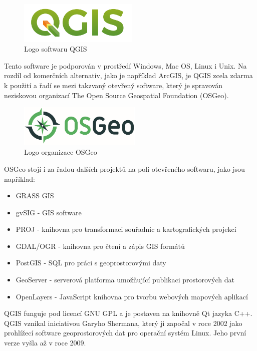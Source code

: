 \documentclass[a4paper,oneside,12pt]{book}
\begin{document}
\begin{figure}[ht] \label{obr2}
\centering
\includegraphics[height=2cm]{pictures/qgis-logo.png}
\caption{Logo softwaru QGIS}
\label{fig:QGIS}
\end{figure}

\hspace{10mm} Tento software je podporován v prostředí Windows, Mac OS, Linux i Unix. Na rozdíl od komerčních alternativ, jako je například ArcGIS, je QGIS zcela zdarma k použití a řadí se mezi takzvaný otevřený software, který je spravován neziskovou organizací The Open Source Geospatial Foundation (OSGeo).

\begin{figure}[ht] \label{obr3}
\centering
\includegraphics[height=2cm]{pictures/Osgeo.png}
\caption{ Logo organizace OSGeo}
\label{fig:OSGEO}
\end{figure}

\hspace{10mm} OSGeo stojí i za řadou dalších projektů na poli otevřeného softwaru, jako jsou například:
\begin{itemize}
\item GRASS GIS 
\item gvSIG - GIS software
\item PROJ - knihovna pro transformaci souřadnic a kartografických projekcí
\item GDAL/OGR - knihovna pro čtení a zápis GIS formátů
\item PostGIS - SQL pro práci s geoprostorovými daty
\item GeoServer - serverová platforma umožňující publikaci prostorových dat 
\item OpenLayers - JavaScript knihovna pro tvorbu webových mapových aplikací
\end{itemize}


\hspace{10mm} QGIS funguje pod licencí GNU GPL a je postaven na knihovně Qt jazyka C++. QGIS vznikal iniciativou Garyho Shermana, který ji započal v roce 2002 jako prohlížecí software geoprostorových dat pro operační systém Linux. Jeho první verze vyšla až v roce 2009. \cite{Matejova2019}
\end{document}
